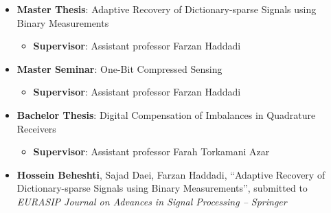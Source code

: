 

\begin{itemize}
	\item{
	            \textbf{Master Thesis}: Adaptive Recovery of Dictionary-sparse Signals using Binary Measurements
	            \begin{itemize}
		            \item \textbf{Supervisor}: Assistant professor Farzan Haddadi
	            \end{itemize}
	      }
	\item{
	            \textbf{Master Seminar}: One-Bit Compressed Sensing
	            \begin{itemize}
		            \item \textbf{Supervisor}: Assistant professor Farzan Haddadi
	            \end{itemize}
	      }
	\item{
	            \textbf{Bachelor Thesis}: Digital Compensation of Imbalances in Quadrature Receivers
	            \begin{itemize}
		            \item \textbf{Supervisor}: Assistant professor Farah Torkamani Azar
	            \end{itemize}
	      }
	
	\item{
	            \textbf{Hossein Beheshti}, Sajad Daei, Farzan Haddadi, ``Adaptive Recovery of Dictionary-sparse Signals using Binary Measurements'',
	            submitted to \emph{EURASIP Journal on Advances in Signal Processing -- Springer}
	      }
	\\
\end{itemize}
